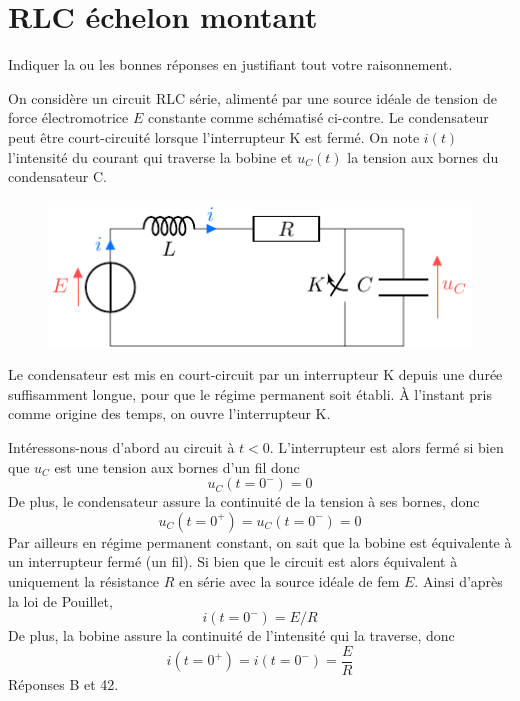 \documentclass[a4paper, 12pt, final, garamond]{book}
\begin{document}
\section{RLC échelon montant}

\begin{center}
	Indiquer la ou les bonnes réponses en justifiant tout votre raisonnement.
\end{center}

On considère un circuit RLC série, alimenté par une source idéale de tension de
force électromotrice $E$ constante comme schématisé ci-contre. Le condensateur
peut être court-circuité lorsque l'interrupteur K est fermé. On note $i(t)$
l'intensité du courant qui traverse la bobine et $u_C(t)$ la tension aux bornes
du condensateur C.

\begin{figure}[htbp]
	\centering
	\includegraphics[width=.5\linewidth]{../2023/02_TD/02_elec/E4/figures/rlc_montant_switch}
\end{figure}

Le condensateur est mis en court-circuit par un interrupteur K depuis une durée
suffisamment longue, pour que le régime permanent soit établi. À l'instant pris
comme origine des temps, on ouvre l'interrupteur K.

{ Intéressons-nous d'abord au circuit à $t<0$. L'interrupteur est alors fermé si
	bien que $u_C$ est une tension aux bornes d'un fil donc
	\[
		u_C\left(t=0^-\right)=0
	\]
	De plus, le condensateur assure la continuité de la tension à ses bornes,
	donc
	\[
		u_C\left(t=0^+\right)=u_C\left(t=0^-\right)=0
	\]
	Par ailleurs en régime permanent constant, on sait que la bobine est
	équivalente à un interrupteur fermé (un fil). Si bien que le circuit est alors
	équivalent à uniquement la résistance $R$ en série avec la source idéale de
	fem $E$. Ainsi d'après la loi de Pouillet,
	\[
		i\left(t=0^-\right)=E/R
	\]
	De plus, la bobine assure la continuité de l'intensité qui la traverse, donc
	\[
		i\left(t=0^+\right)=i\left(t=0^-\right)=\frac{E}{R}
	\]
	Réponses B et 42.
}
\end{document}
